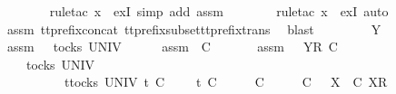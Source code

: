 \begin{isabellebody}
\ \ \ \ \ \ \isamarkupfalse%
\ {\isacharparenleft}rule{\isacharunderscore}tac\ x{\isacharequal}{\isachardoublequoteopen}{\isasymrho}{\isacharprime}{\isachardoublequoteclose}\ \ exI{\isacharcomma}\ simp\ add{\isacharcolon}\ assm{}{\isacharparenright}\isanewline
\ \ \ \ \ \ \isamarkupfalse%
\ {\isacharparenleft}rule{\isacharunderscore}tac\ x{\isacharequal}{\isachardoublequoteopen}{\isacharbrackleft}{\isacharbrackright}{\isachardoublequoteclose}\ \ exI{\isacharcomma}\ auto{\isacharparenright}\isanewline
\ \ \ \ \ \ \isamarkupfalse%
\ assm{}\ tt{\isacharunderscore}prefix{\isacharunderscore}concat\ tt{\isacharunderscore}prefix{\isacharunderscore}subset{\isacharunderscore}tt{\isacharunderscore}prefix{\isacharunderscore}trans\ \isamarkupfalse%
\ blast\isanewline
\ \ \isamarkupfalse%
\isanewline
\ \ \ \ \isamarkupfalse%
\ Y\isanewline
\ \ \ \ \isamarkupfalse%
\ assm{}{\isacharcolon}\ {\isachardoublequoteopen}{\isasymrho}{\isacharprime}\ {\isasymin}\ tocks\ UNIV{\isachardoublequoteclose}\isanewline
\ \ \ \ \isamarkupfalse%
\ assm{}{\isacharcolon}\ {\isachardoublequoteopen}{\isasymsigma}{\isacharprime}\ {\isasymlesssim}\isactrlsub C\ {\isasymsigma}{\isachardoublequoteclose}\isanewline
\ \ \ \ \isamarkupfalse%
\ assm{}{\isacharcolon}\ {\isachardoublequoteopen}{\isasymrho}{\isacharprime}\ {\isacharat}\ {\isacharbrackleft}{\isacharbrackleft}Y{\isacharbrackright}\isactrlsub R{\isacharbrackright}\ {\isasymlesssim}\isactrlsub C\ {\isasymrho}{\isachardoublequoteclose}\isanewline
\ \ \ \ \isamarkupfalse%
\ {\isachardoublequoteopen}{\isasymexists}{\isasymrho}{\isacharprime}{\isachardot}\ {\isasymrho}{\isacharprime}\ {\isasymin}\ tocks\ UNIV\ {\isasymand}\isanewline
\ \ \ \ \ \ \ \ \ {\isacharparenleft}{\isasymexists}{\isasymsigma}{\isacharprime}{\isachardot}\ {\isacharparenleft}{\isasymforall}t{\isasymin}tocks\ UNIV{\isachardot}\ t\ {\isasymle}\isactrlsub C\ {\isasymrho}{\isacharprime}\ {\isacharat}\ {\isasymsigma}{\isacharprime}\ {\isasymlongrightarrow}\ t\ {\isasymle}\isactrlsub C\ {\isasymrho}{\isacharprime}{\isacharparenright}\ {\isasymand}\ {\isasymrho}{\isacharprime}\ {\isacharat}\ {\isasymsigma}{\isacharprime}\ {\isasymlesssim}\isactrlsub C\ {\isasymrho}\ {\isacharat}\ {\isasymsigma}\ {\isasymand}\ {\isacharparenleft}{\isasymsigma}{\isacharprime}\ {\isasymlesssim}\isactrlsub C\ {\isasymsigma}\ {\isasymor}\ {\isacharparenleft}{\isasymexists}X{\isachardot}\ {\isasymsigma}{\isacharprime}\ {\isasymlesssim}\isactrlsub C\ {\isacharbrackleft}X{\isacharbrackright}\isactrlsub R\ {\isacharhash}\ {\isasymsigma}{\isacharparenright}{\isacharparenright}{\isacharparenright}{\isachardoublequoteclose}\isanewline

\end{isabellebody}

